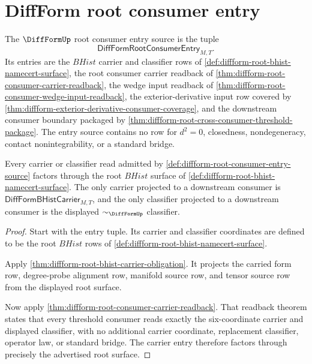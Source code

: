 \section{DiffForm root consumer entry}
\label{sec:diffform-root-consumer-entry}

\begin{definition}
\label{def:diffform-root-consumer-entry-source}
The $\DiffFormUp$ root consumer entry source is the tuple
$$
\mathsf{DiffFormRootConsumerEntry}_{M,T}.
$$
Its entries are the $BHist$ carrier and classifier rows of
\autoref{def:diffform-root-bhist-namecert-surface}, the root consumer carrier
readback of \autoref{thm:diffform-root-consumer-carrier-readback}, the wedge
input readback of
\autoref{thm:diffform-root-consumer-wedge-input-readback}, the
exterior-derivative input row covered by
\autoref{thm:diffform-exterior-derivative-consumer-coverage}, and the
downstream consumer boundary packaged by
\autoref{thm:diffform-root-cross-consumer-threshold-package}. The entry
source contains no row for $d^2=0$, closedness, nondegeneracy, contact
nonintegrability, or a standard bridge.
\end{definition}

\begin{theorem}
\label{thm:diffform-root-consumer-entry-carrier}
Every carrier or classifier read admitted by
\autoref{def:diffform-root-consumer-entry-source} factors through the root
$BHist$ surface of \autoref{def:diffform-root-bhist-namecert-surface}. The
only carrier projected to a downstream consumer is
$\mathsf{DiffFormBHistCarrier}_{M,T}$, and the only classifier projected to a
downstream consumer is the displayed $\sim_{\DiffFormUp}$ classifier.
\end{theorem}
\begin{proof}
Start with the entry tuple. Its carrier and classifier coordinates are
defined to be the root $BHist$ rows of
\autoref{def:diffform-root-bhist-namecert-surface}.

Apply \autoref{thm:diffform-root-bhist-carrier-obligation}. It projects the
carried form row, degree-probe alignment row, manifold source row, and tensor
source row from the displayed root surface.

Now apply \autoref{thm:diffform-root-consumer-carrier-readback}. That
readback theorem states that every threshold consumer reads exactly the
six-coordinate carrier and displayed classifier, with no additional carrier
coordinate, replacement classifier, operator law, or standard bridge. The
carrier entry therefore factors through precisely the advertised root
surface.
\end{proof}

